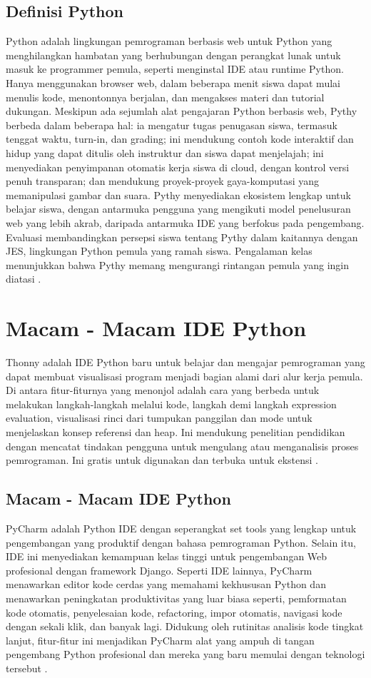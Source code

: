 \subsection{Definisi Python}
Python adalah lingkungan pemrograman berbasis web untuk Python yang menghilangkan hambatan yang berhubungan dengan perangkat lunak untuk masuk ke programmer pemula, seperti menginstal IDE atau runtime Python. Hanya menggunakan browser web, dalam beberapa menit siswa dapat mulai menulis kode, menontonnya berjalan, dan mengakses materi dan tutorial dukungan. Meskipun ada sejumlah alat pengajaran Python berbasis web, Pythy berbeda dalam beberapa hal: ia mengatur tugas penugasan siswa, termasuk tenggat waktu, turn-in, dan grading; ini mendukung contoh kode interaktif dan hidup yang dapat ditulis oleh instruktur dan siswa dapat menjelajah; ini menyediakan penyimpanan otomatis kerja siswa di cloud, dengan kontrol versi penuh transparan; dan mendukung proyek-proyek gaya-komputasi yang memanipulasi gambar dan suara. Pythy menyediakan ekosistem lengkap untuk belajar siswa, dengan antarmuka pengguna yang mengikuti model penelusuran web yang lebih akrab, daripada antarmuka IDE yang berfokus pada pengembang. Evaluasi membandingkan persepsi siswa tentang Pythy dalam kaitannya dengan JES, lingkungan Python pemula yang ramah siswa. Pengalaman kelas menunjukkan bahwa Pythy memang mengurangi rintangan pemula yang ingin diatasi \cite{edwards2014pythy}.

\section{Macam - Macam IDE Python}
Thonny adalah IDE Python baru untuk belajar dan mengajar pemrograman yang dapat membuat visualisasi program menjadi bagian alami dari alur kerja pemula.
Di antara fitur-fiturnya yang menonjol adalah cara yang berbeda untuk melakukan langkah-langkah melalui kode, langkah demi langkah expression evaluation, visualisasi rinci dari tumpukan panggilan dan mode untuk menjelaskan konsep referensi dan heap. Ini mendukung penelitian pendidikan dengan mencatat tindakan pengguna untuk mengulang atau menganalisis proses pemrograman. Ini gratis untuk digunakan dan terbuka untuk ekstensi \cite{annamaa2015introducing}.

\subsection{Macam - Macam IDE Python}
PyCharm adalah Python IDE dengan seperangkat set tools yang lengkap untuk pengembangan yang produktif dengan bahasa pemrograman Python. Selain itu, IDE ini menyediakan kemampuan kelas tinggi untuk pengembangan Web profesional dengan framework Django. Seperti IDE lainnya, PyCharm menawarkan editor kode cerdas yang memahami kekhususan Python dan menawarkan peningkatan produktivitas yang luar biasa seperti, pemformatan kode otomatis, penyelesaian kode, refactoring, impor otomatis, navigasi kode dengan sekali klik, dan banyak lagi. Didukung oleh rutinitas analisis kode tingkat lanjut, fitur-fitur ini menjadikan PyCharm alat yang ampuh di tangan pengembang Python profesional dan mereka yang baru memulai dengan teknologi tersebut \cite{fifli2016pirhoogammarhoalphamumualpha}.

